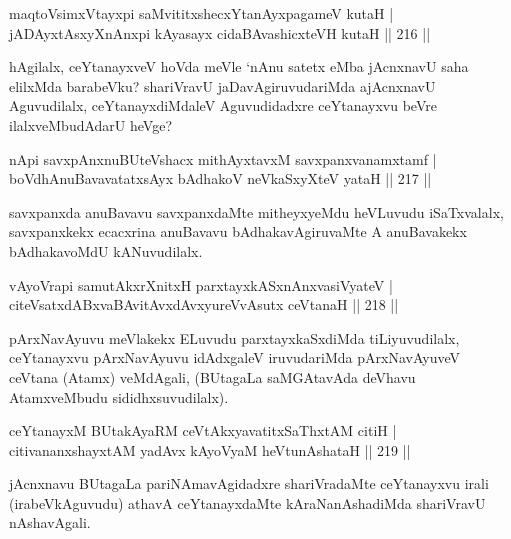 \begin{shl}
maqtoV\s simxVtayxpi saMvititxshecxYtanAyxpagameV kutaH | \\
jADAyxtAsxyXnAnxpi kAyasayx cidaBAvashicxteVH kutaH \hfill ||  216 ||  
\end{shl}

\begin{artha}
hAgilalx, ceYtanayxveV hoVda meVle `nAnu satetx eMba jAcnxnavU saha elilxMda barabeVku? shariVravU jaDavAgiruvudariMda ajAcnxnavU Aguvudilalx, ceYtanayxdiMdaleV Aguvudidadxre ceYtanayxvu beVre ilalxveMbudAdarU heVge?
\end{artha}


\begin{shl}
nApi savxpAnxnuBUteVshacx mithAyxtavxM savxpanxvanamxtamf | \\
boVdhAnuBavavatatxsAyx bAdhakoV neVkaSxyXteV yataH \hfill ||  217 ||  
\end{shl}

\begin{artha}
savxpanxda anuBavavu savxpanxdaMte mitheyxyeMdu heVLuvudu iSaTxvalalx, savxpanxkekx ecacxrina anuBavavu bAdhakavAgiruvaMte A anuBavakekx bAdhakavoMdU kANuvudilalx.
\end{artha}

\begin{shl}
vAyoVrapi samutAkxrXnitxH parxtayxkASxnAnxvasiVyateV | \\
citeVsatxdABxvaBAvitAvxdAvxyureVvAsutx ceVtanaH \hfill ||  218 ||  
\end{shl}

\begin{artha}
pArxNavAyuvu meVlakekx ELuvudu parxtayxkaSxdiMda tiLiyuvudilalx, ceYtanayxvu pArxNavAyuvu idAdxgaleV iruvudariMda pArxNavAyuveV ceVtana (Atamx) veMdAgali, (BUtagaLa saMGAtavAda deVhavu AtamxveMbudu sididhxsuvudilalx).
\end{artha}


\begin{shl}
ceYtanayxM BUtakAyaRM ceVtAkxyavatitxSaThxtAM citiH | \\
citivananxshayxtAM yadAvx kAyoV\s yaM heVtunAshataH \hfill ||  219 ||  
\end{shl}

\begin{artha}
jAcnxnavu BUtagaLa pariNAmavAgidadxre shariVradaMte ceYtanayxvu irali (irabeVkAguvudu) athavA ceYtanayxdaMte kAraNanAshadiMda shariVravU nAshavAgali.
\end{artha}

